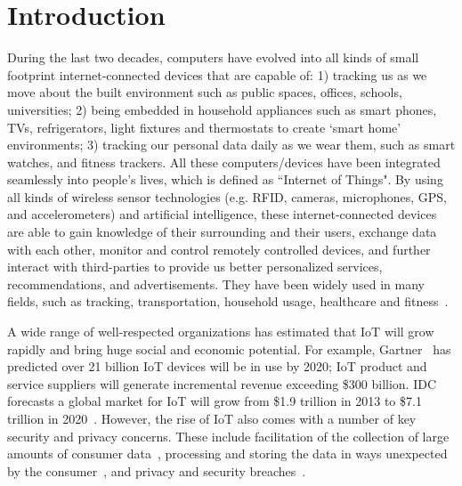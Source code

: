 \chapter{Introduction}\label{chapter:intro}
During the last two decades, computers have evolved into all kinds of small footprint internet-connected devices that are capable of: 1) tracking us as we move about the built environment such as public spaces, offices, schools, universities; 2) being embedded in household appliances such as smart phones, TVs, refrigerators, light fixtures and thermostats to create `smart home' environments; 3) tracking our personal data daily as we wear them, such as smart watches, and fitness trackers. All these computers/devices have been integrated seamlessly into people's lives, which is defined as ``Internet of Things". By using all kinds of wireless sensor technologies (e.g. RFID, cameras, microphones, GPS, and accelerometers) and artificial intelligence, these internet-connected devices are able to gain knowledge of their surrounding and their users, exchange data with each other, monitor and control remotely controlled devices, and further interact with third-parties to provide us better personalized services, recommendations, and advertisements. They have been widely used in many fields, such as tracking, transportation, household usage, healthcare and fitness~\cite{li2011smart, solima2016object, kelly2013towards, jia2012rfid, hassanalieragh2015health}.

A wide range of well-respected organizations has estimated that IoT will grow rapidly and bring huge social and economic potential. For example, Gartner~\cite{eddy2015gartner} has predicted over 21 billion IoT devices will be in use by 2020; IoT product and service suppliers will generate incremental revenue exceeding \$300 billion. IDC forecasts a global market for IoT will grow from \$1.9 trillion in 2013 to \$7.1 trillion in 2020~\cite{press2014idc}. However, the rise of IoT also comes with a number of key security and privacy concerns. These include facilitation of the collection of large amounts of consumer data~\cite{weinberg2015internet}, processing and storing the data in ways unexpected by the consumer~\cite{lu2014overview}, and privacy and security breaches~\cite{lu2014overview, yu2015handling}.


